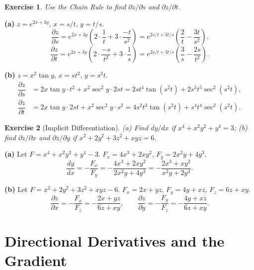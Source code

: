 \documentclass[12pt,a4paper]{article}
\theoremstyle{exstyle}
\newtheorem{exercise}{Exercise}[section]
\newcommand{\pd}[2]{\dfrac{\partial #1}{\partial #2}}
\begin{document}
\begin{exercise}
Use the Chain Rule to find $\partial z/\partial s$ and $\partial z/\partial t$.
\end{exercise}
\begin{solbox}
\textbf{(a)} $z=e^{2x+3y}$, $x=s/t$, $y=t/s$.
\[
  \pd{z}{s}=e^{2x+3y}\!\left(2\cdot\frac{1}{t}+3\cdot\frac{-t}{s^2}\right)
  =e^{2s/t+3t/s}\!\left(\frac{2}{t}-\frac{3t}{s^2}\right).
\]
\[
  \pd{z}{t}=e^{2x+3y}\!\left(2\cdot\frac{-s}{t^2}+3\cdot\frac{1}{s}\right)
  =e^{2s/t+3t/s}\!\left(\frac{3}{s}-\frac{2s}{t^2}\right).
\]

\textbf{(b)} $z=x^2\tan y$, $x=st^2$, $y=s^2t$.
\begin{align*}
  \pd{z}{s}&=2x\tan y\cdot t^2+x^2\sec^2\!y\cdot 2st
  =2st^4\tan(s^2t)+2s^3t^5\sec^2(s^2t),\\
  \pd{z}{t}&=2x\tan y\cdot 2st+x^2\sec^2\!y\cdot s^2
  =4s^2t^3\tan(s^2t)+s^4t^4\sec^2(s^2t).
\end{align*}
\end{solbox}

\begin{exercise}[Implicit Differentiation]
(a) Find $dy/dx$ if $x^4+x^2y^2+y^4=3$;
(b) find $\partial z/\partial x$ and $\partial z/\partial y$ if $x^2+2y^2+3z^2+xyz=6$.
\end{exercise}
\begin{solbox}
\textbf{(a)} Let $F=x^4+x^2y^2+y^4-3$.
$F_x=4x^3+2xy^2$, $F_y=2x^2y+4y^3$.
\[
  \frac{dy}{dx}=-\frac{F_x}{F_y}=-\frac{4x^3+2xy^2}{2x^2y+4y^3}=-\frac{2x^3+xy^2}{x^2y+2y^3}.
\]

\textbf{(b)} Let $F=x^2+2y^2+3z^2+xyz-6$.
$F_x=2x+yz$, $F_y=4y+xz$, $F_z=6z+xy$.
\[
  \pd{z}{x}=-\frac{F_x}{F_z}=-\frac{2x+yz}{6z+xy},\qquad
  \pd{z}{y}=-\frac{F_y}{F_z}=-\frac{4y+xz}{6z+xy}.
\]
\end{solbox}

\section{Directional Derivatives and the Gradient}
\end{document}
